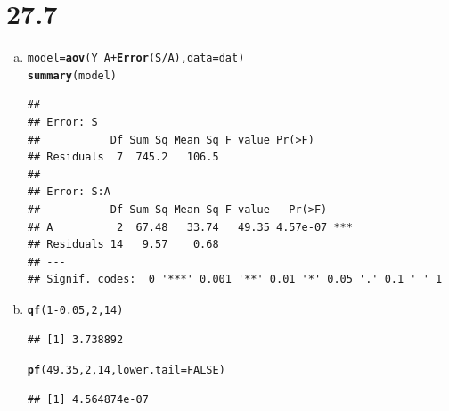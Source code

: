 \documentclass{article}\usepackage[]{graphicx}\usepackage[]{color}
\makeatletter
\newcommand{\hlnum}[1]{\textcolor[rgb]{0.686,0.059,0.569}{#1}}%
\newcommand{\hlopt}[1]{\textcolor[rgb]{0,0,0}{#1}}%
\newcommand{\hlstd}[1]{\textcolor[rgb]{0.345,0.345,0.345}{#1}}%
\newcommand{\hlkwb}[1]{\textcolor[rgb]{0.69,0.353,0.396}{#1}}%
\newcommand{\hlkwc}[1]{\textcolor[rgb]{0.333,0.667,0.333}{#1}}%
\newcommand{\hlkwd}[1]{\textcolor[rgb]{0.737,0.353,0.396}{\textbf{#1}}}%
\newenvironment{kframe}{%
 \def\at@end@of@kframe{}%
 \ifinner\ifhmode%
  \def\at@end@of@kframe{\end{minipage}}%
  \begin{minipage}{\columnwidth}%
 \fi\fi%
 \def\FrameCommand##1{\hskip\@totalleftmargin \hskip-\fboxsep
 \colorbox{shadecolor}{##1}\hskip-\fboxsep
     \hskip-\linewidth \hskip-\@totalleftmargin \hskip\columnwidth}%
 \MakeFramed {\advance\hsize-\width
   \@totalleftmargin\z@ \linewidth\hsize
   \@setminipage}}%
 {\par\unskip\endMakeFramed%
 \at@end@of@kframe}
\newenvironment{knitrout}{}{} %
\makeatother
\begin{document}
\section{27.7}

\begin{enumerate}[(a)]

\item

\begin{knitrout}
\color{fgcolor}\begin{kframe}
\begin{alltt}
  \hlstd{model} \hlkwb{=} \hlkwd{aov}\hlstd{(Y}\hlopt{~} \hlstd{A} \hlopt{+} \hlkwd{Error}\hlstd{(S}\hlopt{/}\hlstd{A),} \hlkwc{data} \hlstd{= dat)}
  \hlkwd{summary}\hlstd{(model)}
\end{alltt}
\begin{verbatim}
## 
## Error: S
##           Df Sum Sq Mean Sq F value Pr(>F)
## Residuals  7  745.2   106.5               
## 
## Error: S:A
##           Df Sum Sq Mean Sq F value   Pr(>F)    
## A          2  67.48   33.74   49.35 4.57e-07 ***
## Residuals 14   9.57    0.68                     
## ---
## Signif. codes:  0 '***' 0.001 '**' 0.01 '*' 0.05 '.' 0.1 ' ' 1
\end{verbatim}
\end{kframe}
\end{knitrout}

\item

\begin{knitrout}
\color{fgcolor}\begin{kframe}
\begin{alltt}
  \hlkwd{qf}\hlstd{(}\hlnum{1}\hlopt{-}\hlnum{0.05}\hlstd{,} \hlnum{2}\hlstd{,} \hlnum{14}\hlstd{)}
\end{alltt}
\begin{verbatim}
## [1] 3.738892
\end{verbatim}
\begin{alltt}
  \hlkwd{pf}\hlstd{(}\hlnum{49.35}\hlstd{,} \hlnum{2}\hlstd{,} \hlnum{14}\hlstd{,} \hlkwc{lower.tail} \hlstd{=} \hlnum{FALSE}\hlstd{)}
\end{alltt}
\begin{verbatim}
## [1] 4.564874e-07
\end{verbatim}
\end{kframe}
\end{knitrout}


\end{enumerate}
\end{document}
